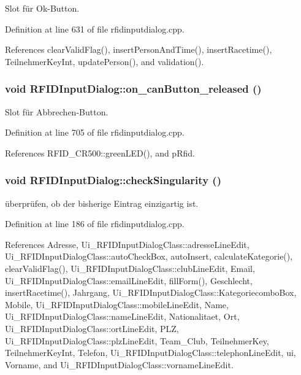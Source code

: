 Slot für Ok-Button. 



Definition at line 631 of file rfidinputdialog.cpp.

References clearValidFlag(), insertPersonAndTime(), insertRacetime(), TeilnehmerKeyInt, updatePerson(), and validation().\hypertarget{class_r_f_i_d_input_dialog_8f58e254774a1995a54ed0be10183ad9}{
\subsubsection[on\_\-canButton\_\-released]{\setlength{\rightskip}{0pt plus 5cm}void RFIDInputDialog::on\_\-canButton\_\-released ()}}
\label{class_r_f_i_d_input_dialog_8f58e254774a1995a54ed0be10183ad9}


Slot für Abbrechen-Button. 



Definition at line 705 of file rfidinputdialog.cpp.

References RFID\_\-CR500::greenLED(), and pRfid.\hypertarget{class_r_f_i_d_input_dialog_02ecbebd64e8e4d176f9da497366dede}{
\subsubsection[checkSingularity]{\setlength{\rightskip}{0pt plus 5cm}void RFIDInputDialog::checkSingularity ()}}
\label{class_r_f_i_d_input_dialog_02ecbebd64e8e4d176f9da497366dede}


überprüfen, ob der bisherige Eintrag einzigartig ist. 



Definition at line 186 of file rfidinputdialog.cpp.

References Adresse, Ui\_\-RFIDInputDialogClass::adresseLineEdit, Ui\_\-RFIDInputDialogClass::autoCheckBox, autoInsert, calculateKategorie(), clearValidFlag(), Ui\_\-RFIDInputDialogClass::clubLineEdit, Email, Ui\_\-RFIDInputDialogClass::emailLineEdit, fillForm(), Geschlecht, insertRacetime(), Jahrgang, Ui\_\-RFIDInputDialogClass::KategoriecomboBox, Mobile, Ui\_\-RFIDInputDialogClass::mobileLineEdit, Name, Ui\_\-RFIDInputDialogClass::nameLineEdit, Nationalitaet, Ort, Ui\_\-RFIDInputDialogClass::ortLineEdit, PLZ, Ui\_\-RFIDInputDialogClass::plzLineEdit, Team\_\-Club, TeilnehmerKey, TeilnehmerKeyInt, Telefon, Ui\_\-RFIDInputDialogClass::telephonLineEdit, ui, Vorname, and Ui\_\-RFIDInputDialogClass::vornameLineEdit.

